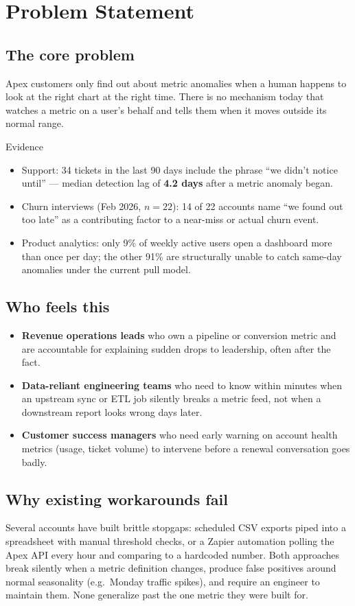 \section{Problem Statement}

\subsection*{The core problem}
Apex customers only find out about metric anomalies when a human happens to look at the
right chart at the right time. There is no mechanism today that watches a metric on a
user's behalf and tells them when it moves outside its normal range.

\begin{riskbox}{Evidence}
\begin{itemize}
  \item Support: 34 tickets in the last 90 days include the phrase ``we didn't notice
    until'' --- median detection lag of \textbf{4.2 days} after a metric anomaly began.
  \item Churn interviews (Feb 2026, $n=22$): 14 of 22 accounts name ``we found out too
    late'' as a contributing factor to a near-miss or actual churn event.
  \item Product analytics: only 9\% of weekly active users open a dashboard more than
    once per day; the other 91\% are structurally unable to catch same-day anomalies
    under the current pull model.
\end{itemize}
\end{riskbox}

\subsection*{Who feels this}
\begin{itemize}
  \item \textbf{Revenue operations leads} who own a pipeline or conversion metric and
    are accountable for explaining sudden drops to leadership, often after the fact.
  \item \textbf{Data-reliant engineering teams} who need to know within minutes when an
    upstream sync or ETL job silently breaks a metric feed, not when a downstream report
    looks wrong days later.
  \item \textbf{Customer success managers} who need early warning on account health
    metrics (usage, ticket volume) to intervene before a renewal conversation goes badly.
\end{itemize}

\subsection*{Why existing workarounds fail}
Several accounts have built brittle stopgaps: scheduled CSV exports piped into a
spreadsheet with manual threshold checks, or a Zapier automation polling the Apex API
every hour and comparing to a hardcoded number. Both approaches break silently when a
metric definition changes, produce false positives around normal seasonality (e.g.\ Monday
traffic spikes), and require an engineer to maintain them. None generalize past the one
metric they were built for.

